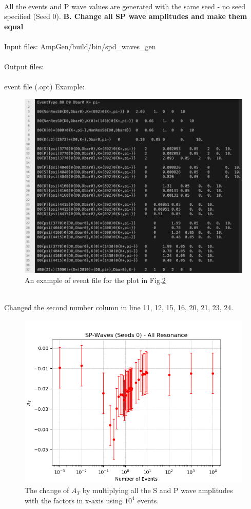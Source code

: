 \\
All the events and P wave values are generated with the same seed - no seed specified (Seed 0).
\clearpage
\noindent \textbf{B. Change all SP wave amplitudes and make them equal}
\\
\\
\indent Input files: AmpGen/build/bin/spd\_waves\_gen 
\\
\\
\indent Output files: 
\\
\\
event file (.opt) Example:
\begin{figure}[h]
\center
\includegraphics*[width=0.96\linewidth]{p_wave/event_info_sp_10000}
\caption{An example of event file for the plot in Fig.\ref{at_pwave_all_10000}}
\label{event_info_p_10000}
\end{figure}
\\
Changed the second number column in line 11, 12, 15, 16, 20, 21, 23, 24.
\begin{figure}[h]
\center
\includegraphics*[width=0.96\linewidth]{p_wave/at_spwave_all_10000}
\caption{The change of $A_T$ by multiplying all the S and P wave amplitudes with the factors in x-axis using $10^4$ events.}
\label{at_pwave_all_10000}
\end{figure}
